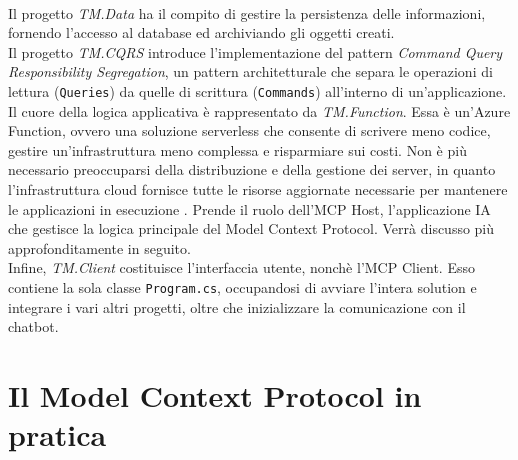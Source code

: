 \\
Il progetto \textit{TM.Data} ha il compito di gestire la persistenza delle informazioni, fornendo l'accesso al database
ed archiviando gli oggetti creati.
\\
Il progetto \textit{TM.CQRS} introduce l'implementazione del pattern \textit{Command Query Responsibility Segregation}, un pattern
architetturale che separa le operazioni di lettura (\texttt{Queries}) da quelle di scrittura (\texttt{Commands}) all'interno di un'applicazione.
\\
Il cuore della logica applicativa è rappresentato da \textit{TM.Function}. Essa è un'Azure Function, ovvero una soluzione serverless
che consente di scrivere meno codice, gestire un'infrastruttura meno complessa e risparmiare sui costi. Non è più necessario preoccuparsi
della distribuzione e della gestione dei server, in quanto l'infrastruttura cloud fornisce tutte le risorse aggiornate necessarie per mantenere
le applicazioni in esecuzione \cite{azurefunctions_msdocs}. Prende il ruolo dell'MCP Host, l'applicazione IA che gestisce la logica principale del
Model Context Protocol. Verrà discusso più approfonditamente in seguito.
\\
Infine, \textit{TM.Client} costituisce l'interfaccia utente, nonchè l'MCP Client. Esso contiene la sola classe \texttt{Program.cs}, occupandosi
di avviare l'intera solution e integrare i vari altri progetti, oltre che inizializzare la comunicazione con il chatbot.

\section{Il Model Context Protocol in pratica}

